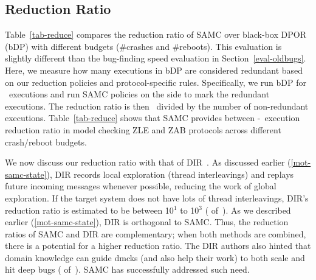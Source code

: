 

\subsection{Reduction Ratio}
\label{eval-reduce}


Table~\ref{tab-reduce} compares the reduction ratio of SAMC over
black-box DPOR (bDP) with different budgets (\#crashes and \#reboots).
This evaluation is slightly different than the bug-finding speed evaluation
in Section~\ref{eval-oldbugs}.  Here, we measure how many executions in bDP
are considered redundant based on our reduction policies and
protocol-specific rules.  Specifically, we run bDP for
\numRedRatioExecs\ executions and run SAMC policies on the side to mark the
redundant executions.  The reduction ratio is then
\numRedRatioExecs\ divided by the number of non-redundant executions.
Table~\ref{tab-reduce} shows that SAMC provides between
\numMinRedRatio-\numMaxRedRatio\ execution reduction ratio in model
checking ZLE and ZAB protocols across different crash/reboot budgets.


We now discuss our reduction ratio with that of DIR~\cite{Guo+11-Demeter}.
As discussed earlier (\sec\ref{mot-samc-state}), DIR records local exploration
(thread interleavings) and replays future incoming messages whenever
possible, reducing the work of global exploration.  If the target system
does not have lots of thread interleavings, DIR's reduction ratio is
estimated to be between 10$^{1}$ to 10$^{3}$ (
of~\cite{Guo+11-Demeter}).  As we described earlier (\sec\ref{mot-samc-state}),
DIR is orthogonal to SAMC.  Thus, the reduction ratios of SAMC and DIR are
complementary; when both methods are combined, there is a potential for a
higher reduction ratio.  The DIR authors also hinted that domain knowledge
can guide dmcks (and also help their work) to both scale and hit deep bugs
( of~\cite{Guo+11-Demeter}).  SAMC has successfully addressed such
need.




